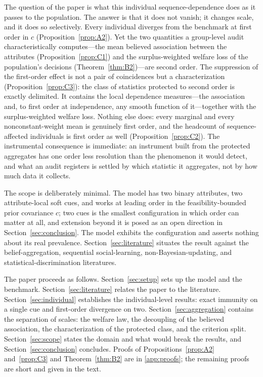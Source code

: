\documentclass[review,12pt,authoryear]{elsarticle}
\theoremstyle{remark}
\theoremstyle{definition}
\begin{document}
The question of the paper is what this individual sequence-dependence does as it passes to the
population. The answer is that it does not vanish; it changes scale, and it does so selectively.
Every individual diverges from the benchmark at first order in $c$
(Proposition~\ref{prop:A2}). Yet the two quantities a group-level audit characteristically
computes---the mean believed association between the attributes
(Proposition~\ref{prop:C1}) and the surplus-weighted welfare loss of the population's decisions
(Theorem~\ref{thm:B2})---are second order. The suppression of the first-order effect is not a
pair of coincidences but a characterization (Proposition~\ref{prop:C3}): the class of statistics
protected to second order is exactly delimited. It contains the local dependence measures---the
association and, to first order at independence, any smooth function of it---together with the
surplus-weighted welfare loss. Nothing else does: every marginal and every nonconstant-weight
mean is genuinely first order, and the headcount of sequence-affected individuals is first order
as well (Proposition~\ref{prop:C2}). The instrumental consequence is immediate: an instrument
built from the protected aggregates has one order less resolution than the phenomenon it would
detect, and what an audit registers is settled by which statistic it aggregates, not by how much
data it collects.

The scope is deliberately minimal. The model has two binary attributes, two attribute-local soft
cues, and works at leading order in the feasibility-bounded prior covariance $c$; two cues is
the smallest configuration in which order can matter at all, and extension beyond it is posed as
an open direction in Section~\ref{sec:conclusion}. The model exhibits the configuration and
asserts nothing about its real prevalence. Section~\ref{sec:literature} situates the result
against the belief-aggregation, sequential social-learning, non-Bayesian-updating, and
statistical-discrimination literatures.

The paper proceeds as follows. Section~\ref{sec:setup} sets up the model and the benchmark.
Section~\ref{sec:literature} relates the paper to the literature.
Section~\ref{sec:individual} establishes the individual-level results: exact immunity on a
single cue and first-order divergence on two. Section~\ref{sec:aggregation} contains the
separation of scales: the welfare law, the decoupling of the believed association, the
characterization of the protected class, and the criterion split.
Section~\ref{sec:scope} states the domain and what would break the results, and
Section~\ref{sec:conclusion} concludes. Proofs of Propositions~\ref{prop:A2}
and~\ref{prop:C3} and Theorem~\ref{thm:B2} are in \ref{app:proofs}; the remaining proofs are
short and given in the text.
\end{document}
